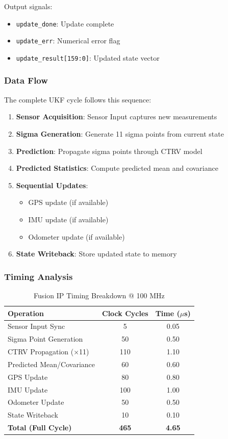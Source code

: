 \documentclass[12pt,a4paper]{report}
\begin{document}
Output signals:
\begin{itemize}
    \item \texttt{update\_done}: Update complete
    \item \texttt{update\_err}: Numerical error flag
    \item \texttt{update\_result[159:0]}: Updated state vector
\end{itemize}

\subsubsection{Data Flow}

The complete UKF cycle follows this sequence:

\begin{enumerate}
    \item \textbf{Sensor Acquisition}: Sensor Input captures new measurements
    \item \textbf{Sigma Generation}: Generate 11 sigma points from current state
    \item \textbf{Prediction}: Propagate sigma points through CTRV model
    \item \textbf{Predicted Statistics}: Compute predicted mean and covariance
    \item \textbf{Sequential Updates}: 
    \begin{itemize}
        \item GPS update (if available)
        \item IMU update (if available)
        \item Odometer update (if available)
    \end{itemize}
    \item \textbf{State Writeback}: Store updated state to memory
\end{enumerate}

\subsubsection{Timing Analysis}

\begin{table}[H]
\centering
\caption{Fusion IP Timing Breakdown @ 100 MHz}
\begin{tabular}{|l|c|c|}
\hline
\textbf{Operation} & \textbf{Clock Cycles} & \textbf{Time ($\mu$s)} \\
\hline
Sensor Input Sync & 5 & 0.05 \\
Sigma Point Generation & 50 & 0.50 \\
CTRV Propagation (×11) & 110 & 1.10 \\
Predicted Mean/Covariance & 60 & 0.60 \\
GPS Update & 80 & 0.80 \\
IMU Update & 100 & 1.00 \\
Odometer Update & 50 & 0.50 \\
State Writeback & 10 & 0.10 \\
\hline
\textbf{Total (Full Cycle)} & \textbf{465} & \textbf{4.65} \\
\hline
\end{tabular}
\end{table}
\end{document}
